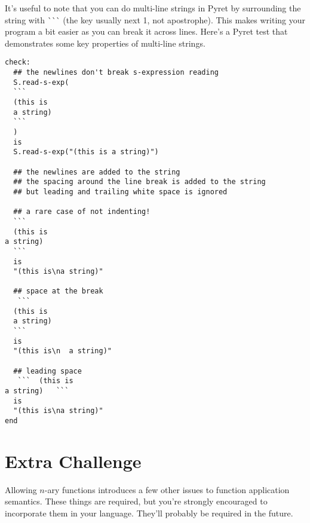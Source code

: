 \documentclass[10pt]{article}
\begin{document}
It's useful to note that you can do multi-line strings in Pyret by surrounding the string with  \`{}\`{}\`{} (the key usually next 1, not apostrophe). This makes writing your program a bit easier as you can break it across lines. Here's a Pyret test that demonstrates some key properties of multi-line strings.

\begin{verbatim}
check:
  ## the newlines don't break s-expression reading
  S.read-s-exp(
  ``` 
  (this is 
  a string)
  ```
  )
  is
  S.read-s-exp("(this is a string)")
  
  ## the newlines are added to the string
  ## the spacing around the line break is added to the string
  ## but leading and trailing white space is ignored
  
  ## a rare case of not indenting!
  ``` 
  (this is
a string)
  ```
  is
  "(this is\na string)"
  
  ## space at the break
   ``` 
  (this is
  a string)
  ```
  is
  "(this is\n  a string)"
  
  ## leading space
   ```  (this is
a string)   ```
  is
  "(this is\na string)"
end
\end{verbatim}

\section{Extra Challenge}

Allowing $n$-ary functions introduces a few other issues to function application semantics.  These things are required, but you're strongly encouraged to incorporate them in your language. They'll probably be required in the future.
\end{document}
